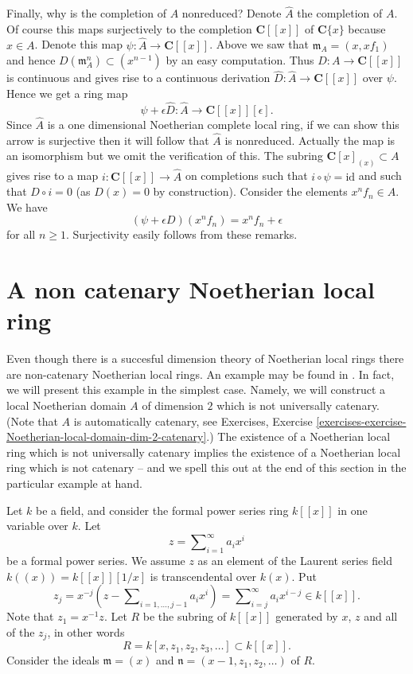 \medskip\noindent
Finally, why is the completion of $A$ nonreduced? Denote $\hat A$ the
completion of $A$. Of course this maps surjectively to the completion
$\mathbf{C}[[x]]$ of $\mathbf{C}\{x\}$ because $x \in A$. Denote
this map $\psi : \hat A \to \mathbf{C}[[x]]$.
Above we saw that $\mathfrak m_A = (x, xf_1)$
and hence $D(\mathfrak m_A^n) \subset (x^{n - 1})$ by an easy
computation. Thus $D : A \to \mathbf{C}[[x]]$ is continuous and
gives rise to a continuous derivation $\hat D : \hat A \to \mathbf{C}[[x]]$
over $\psi$. Hence we get a ring map
$$
\psi + \epsilon \hat D :
\hat A
\longrightarrow
\mathbf{C}[[x]][\epsilon].
$$
Since $\hat A$ is a one dimensional Noetherian complete local ring, if we
can show this arrow is surjective then it will follow that $\hat A$
is nonreduced. Actually the map is an isomorphism but we omit the
verification of this. The subring $\mathbf{C}[x]_{(x)} \subset A$
gives rise to a map $i : \mathbf{C}[[x]] \to \hat A$ on completions such
that $i \circ \psi = \text{id}$ and such that $D \circ i = 0$
(as $D(x) = 0$ by construction). Consider the elements $x^nf_n \in A$.
We have
$$
(\psi + \epsilon D)(x^nf_n) = x^n f_n + \epsilon
$$
for all $n \geq 1$. Surjectivity easily follows from these remarks.




\section{A non catenary Noetherian local ring}
\label{section-non-catenary-Noetherian-local}

\noindent
Even though there is a succesful dimension theory of Noetherian local rings
there are non-catenary Noetherian local rings. An example may be found in
\cite[Appendix, Example 2]{Nagata}. In fact, we will present this example
in the simplest case. Namely, we will construct a local Noetherian domain $A$
of dimension $2$ which is not universally catenary. (Note that $A$ is
automatically catenary, see
Exercises, Exercise
\ref{exercises-exercise-Noetherian-local-domain-dim-2-catenary}.)
The existence of a Noetherian local ring which is not universally
catenary implies the existence of a Noetherian local ring which
is not catenary -- and we spell this out at the end of this section
in the particular example at hand.

\medskip\noindent
Let $k$ be a field, and consider the formal power series ring
$k[[x]]$ in one variable over $k$. Let
$$
z = \sum\nolimits_{i = 1}^\infty a_i x^i
$$
be a formal power series. We assume $z$ as an element of the Laurent
series field $k((x)) = k[[x]][1/x]$ is transcendental over $k(x)$.
Put
$$
z_j
=
x^{-j}(z - \sum\nolimits_{i = 1, \ldots, j - 1} a_i x^i)
=
\sum\nolimits_{i = j}^\infty a_i x^{i - j}
\in k[[x]].
$$
Note that $z_1 = x^{-1} z$.
Let $R$ be the subring of $k[[x]]$ generated by $x$, $z$ and all of the
$z_j$, in other words
$$
R = k[x, z_1, z_2, z_3, \ldots ] \subset k[[x]].
$$
Consider the ideals $\mathfrak m = (x)$ and
$\mathfrak n = (x - 1, z_1, z_2, \ldots)$ of $R$.

